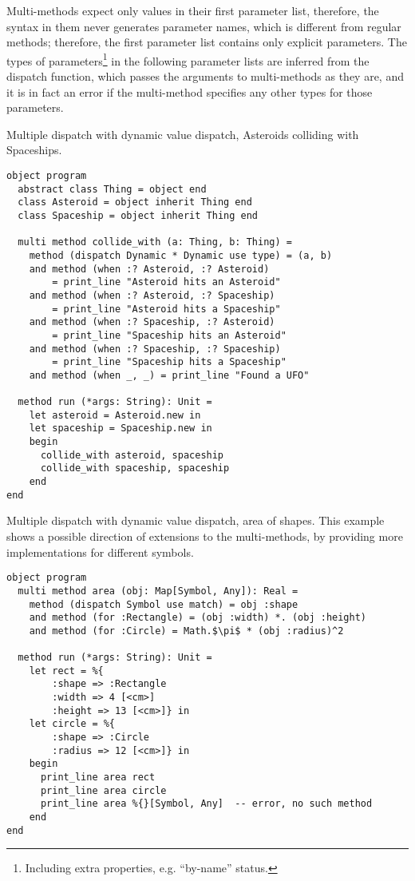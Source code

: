 Multi-methods expect only values in their first parameter list, therefore, the syntax in them never generates parameter names, which is different from regular methods; therefore, the first parameter list contains only explicit parameters. The types of parameters\footnote{Including extra properties, e.g. ``by-name'' status.} in the following parameter lists are inferred from the dispatch function, which passes the arguments to multi-methods as they are, and it is in fact an error if the multi-method specifies any other types for those parameters. 

\example Multiple dispatch with dynamic value dispatch, Asteroids colliding with Spaceships.
\begin{lstlisting}
object program 
  abstract class Thing = object end
  class Asteroid = object inherit Thing end
  class Spaceship = object inherit Thing end
  
  multi method collide_with (a: Thing, b: Thing) =
    method (dispatch Dynamic * Dynamic use type) = (a, b)
    and method (when :? Asteroid, :? Asteroid) 
        = print_line "Asteroid hits an Asteroid"
    and method (when :? Asteroid, :? Spaceship) 
        = print_line "Asteroid hits a Spaceship"
    and method (when :? Spaceship, :? Asteroid) 
        = print_line "Spaceship hits an Asteroid"
    and method (when :? Spaceship, :? Spaceship) 
        = print_line "Spaceship hits a Spaceship"
    and method (when _, _) = print_line "Found a UFO"

  method run (*args: String): Unit =
    let asteroid = Asteroid.new in
    let spaceship = Spaceship.new in
    begin
      collide_with asteroid, spaceship
      collide_with spaceship, spaceship
    end
end
\end{lstlisting}

\example Multiple dispatch with dynamic value dispatch, area of shapes. This example shows a possible direction of extensions to the multi-methods, by providing more implementations for different symbols. 
\begin{lstlisting}
object program
  multi method area (obj: Map[Symbol, Any]): Real =
    method (dispatch Symbol use match) = obj :shape
    and method (for :Rectangle) = (obj :width) *. (obj :height)
    and method (for :Circle) = Math.$\pi$ * (obj :radius)^2

  method run (*args: String): Unit =
    let rect = %{
        :shape => :Rectangle
        :width => 4 [<cm>]
        :height => 13 [<cm>]} in
    let circle = %{
        :shape => :Circle
        :radius => 12 [<cm>]} in
    begin
      print_line area rect 
      print_line area circle
      print_line area %{}[Symbol, Any]  -- error, no such method
    end
end
\end{lstlisting}















